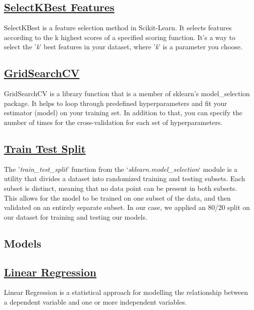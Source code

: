 \documentclass[conference]{IEEEtran}
\begin{document}
    \subsection*{\href{https://scikit-learn.org/stable/modules/generated/sklearn.feature_selection.SelectKBest.html}{SelectKBest Features}}
    SelectKBest is a feature selection method in Scikit-Learn. It selects features according to the k highest scores of a specified scoring function. It's a way to select the '\textit{k}' best features in your dataset, where '\textit{k}' is a parameter you choose.

    \subsection*{\href{https://scikit-learn.org/stable/modules/generated/sklearn.model_selection.GridSearchCV.html}{GridSearchCV}}
    GridSearchCV is a library function that is a member of sklearn's model\_selection package. It helps to loop through predefined hyperparameters and fit your estimator (model) on your training set. In addition to that, you can specify the number of times for the cross-validation for each set of hyperparameters.

    \subsection*{\href{https://scikit-learn.org/stable/modules/generated/sklearn.model_selection.train_test_split.html}{Train Test Split}}
    The '\textit{train\_test\_split}' function from the `\textit{sklearn.model\_selection}` module is a utility that divides a dataset into randomized training and testing subsets. Each subset is distinct, meaning that no data point can be present in both subsets. This allows for the model to be trained on one subset of the data, and then validated on an entirely separate subset. In our case, we applied an 80/20 split on our dataset for training and testing our models.

    \subsection*{Models}
    \subsection{\href{https://en.wikipedia.org/wiki/Linear_regression}{Linear Regression}}
    Linear Regression is a statistical approach for modelling the relationship between a dependent variable and one or more independent variables.
\end{document}
